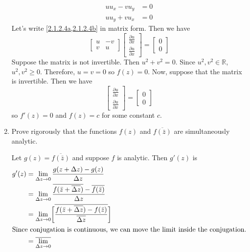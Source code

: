 \begin{enumerate}
\begin{subequations}
    \begin{align}
      uu_x - vu_y & = 0\label{2.1.2.4a}\\
      uu_y + vu_x & = 0\label{2.1.2.4b}
    \end{align}
  \end{subequations}
  Let's write \cref{2.1.2.4a,2.1.2.4b} in matrix form.
  Then we have
  \[
  \begin{bmatrix}
    u & -v\\
    v & u
  \end{bmatrix}
  \begin{bmatrix}
    \frac{\partial u}{\partial x}\\
    \frac{\partial u}{\partial x}
  \end{bmatrix} =
  \begin{bmatrix}
    0\\
    0
  \end{bmatrix}
  \]
  Suppose the matrix is not invertible.
  Then \(u^2 + v^2 = 0\).
  Since \(u^2,v^2\in\mathbb{R}\), \(u^2,v^2\geq 0\).
  Therefore, \(u = v = 0\) so \(f(z) = 0\).
  Now, suppose that the matrix is invertible.
  Then we have
  \[
  \begin{bmatrix}
    \frac{\partial u}{\partial x}\\
    \frac{\partial u}{\partial x}
  \end{bmatrix} =
  \begin{bmatrix}
    0\\
    0
  \end{bmatrix}
  \]
  so \(f'(z) = 0\) and \(f(z) = c\) for some constant \(c\).
\item
  Prove rigorously that the functions \(f(z)\) and \(\overline{f(\bar{z})}\)
  are simultaneously analytic.
  \par\smallskip
  Let \(g(z) = \overline{f(\bar{z})}\) and suppose \(f\) is analytic.
  Then \(g'(z)\)  is
  \begin{align*}
    g'(z) & = \lim_{\Delta z\to 0}\frac{g(z + \Delta z) - g(z)}{\Delta z}\\
          & = \lim_{\Delta z\to 0}
            \frac{\overline{f(\bar{z} + \overline{\Delta z})} -
            \overline{f(\bar{z})}}{\Delta z}\\
          & = \lim_{\Delta z\to 0}\biggl[
            \overline{\frac{f(\bar{z} + \overline{\Delta z}) - f(\bar{z})}
            {\overline{\Delta z}}}\biggr]\\
    \intertext{Since conjugation is continuous, we can move the limit inside
    the conjugation.}
          & = \overline{\lim_{\Delta z\to 0}
}
\end{align*}
\end{enumerate}
